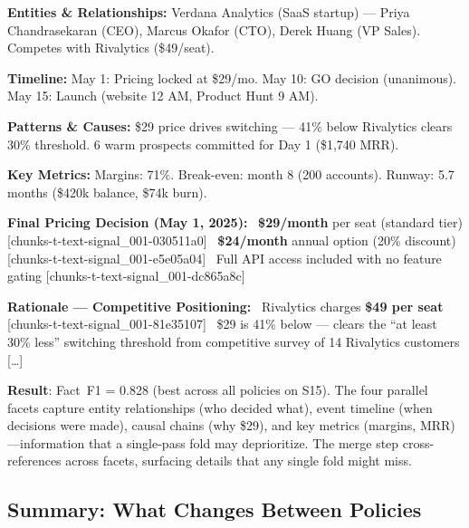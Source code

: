 \documentclass[11pt,a4paper]{article}
\begin{document}
\begin{artifactbox}[title=Merged Faceted Memory (3{,}423 chars --- excerpt)]
\small
\textbf{Entities \& Relationships:}
Verdana Analytics (SaaS startup) --- Priya Chandrasekaran (CEO), Marcus Okafor (CTO),
Derek Huang (VP Sales). Competes with Rivalytics (\$49/seat).

\textbf{Timeline:}
May 1: Pricing locked at \$29/mo. May 10: GO decision (unanimous).
May 15: Launch (website 12 AM, Product Hunt 9 AM).

\textbf{Patterns \& Causes:}
\$29 price drives switching --- 41\% below Rivalytics clears 30\% threshold.
6 warm prospects committed for Day 1 (\$1,740 MRR).

\textbf{Key Metrics:}
Margins: 71\%. Break-even: month 8 (200 accounts). Runway: 5.7 months (\$420k balance, \$74k burn).
\end{artifactbox}

\begin{tracebox}[title=core\_faceted --- Agent Answer (1 tool call)]
\small
\textbf{Final Pricing Decision (May 1, 2025):}
\textbullet\ \textbf{\$29/month} per seat (standard tier) [chunks-t-text-signal\_001-030511a0]
\textbullet\ \textbf{\$24/month} annual option (20\% discount) [chunks-t-text-signal\_001-e5e05a04]
\textbullet\ Full API access included with no feature gating [chunks-t-text-signal\_001-dc865a8c]

\textbf{Rationale --- Competitive Positioning:}
\textbullet\ Rivalytics charges \textbf{\$49 per seat} [chunks-t-text-signal\_001-81e35107]
\textbullet\ \$29 is 41\% below --- clears the ``at least 30\% less'' switching threshold from competitive survey of 14 Rivalytics customers [\ldots]
\end{tracebox}

\textbf{Result}: Fact~F1 = 0.828 (best across all policies on S15). The four parallel facets capture entity relationships (who decided what), event timeline (when decisions were made), causal chains (why \$29), and key metrics (margins, MRR)---information that a single-pass fold may deprioritize. The merge step cross-references across facets, surfacing details that any single fold might miss.

\subsection{Summary: What Changes Between Policies}
\end{document}

